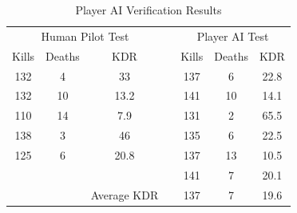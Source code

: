 \documentclass[journal]{IEEEtran}
\begin{document}
\begin{table}[]
\centering
\caption{Player AI Verification Results}
\label{tab:my-table}
\begin{tabular}{ccccccc}
\cline{1-3} \cline{5-7}
\multicolumn{3}{|c|}{Human Pilot Test}                                                       & \multicolumn{1}{c|}{} & \multicolumn{3}{c|}{Player AI Test}                                                         \\ \cline{1-3} \cline{5-7} 
\multicolumn{1}{|c|}{Kills} & \multicolumn{1}{c|}{Deaths} & \multicolumn{1}{c|}{KDR}         & \multicolumn{1}{c|}{} & \multicolumn{1}{c|}{Kills} & \multicolumn{1}{c|}{Deaths} & \multicolumn{1}{c|}{KDR}         \\ \cline{1-3} \cline{5-7} 
\multicolumn{1}{|c|}{132}   & \multicolumn{1}{c|}{4}      & \multicolumn{1}{c|}{33}          & \multicolumn{1}{c|}{} & \multicolumn{1}{c|}{137}   & \multicolumn{1}{c|}{6}      & \multicolumn{1}{c|}{22.8}        \\ \cline{1-3} \cline{5-7} 
\multicolumn{1}{|c|}{132}   & \multicolumn{1}{c|}{10}     & \multicolumn{1}{c|}{13.2}        & \multicolumn{1}{c|}{} & \multicolumn{1}{c|}{141}   & \multicolumn{1}{c|}{10}     & \multicolumn{1}{c|}{14.1}        \\ \cline{1-3} \cline{5-7} 
\multicolumn{1}{|c|}{110}   & \multicolumn{1}{c|}{14}     & \multicolumn{1}{c|}{7.9}         & \multicolumn{1}{c|}{} & \multicolumn{1}{c|}{131}   & \multicolumn{1}{c|}{2}      & \multicolumn{1}{c|}{65.5}        \\ \cline{1-3} \cline{5-7} 
\multicolumn{1}{|c|}{138}   & \multicolumn{1}{c|}{3}      & \multicolumn{1}{c|}{46}          & \multicolumn{1}{c|}{} & \multicolumn{1}{c|}{135}   & \multicolumn{1}{c|}{6}      & \multicolumn{1}{c|}{22.5}        \\ \cline{1-3} \cline{5-7} 
\multicolumn{1}{|c|}{125}   & \multicolumn{1}{c|}{6}      & \multicolumn{1}{c|}{20.8}        & \multicolumn{1}{c|}{} & \multicolumn{1}{c|}{137}   & \multicolumn{1}{c|}{13}     & \multicolumn{1}{c|}{10.5}        \\ \cline{1-3} \cline{5-7} 
                            &                             &                                  & \multicolumn{1}{c|}{} & \multicolumn{1}{c|}{141}   & \multicolumn{1}{c|}{7}      & \multicolumn{1}{c|}{20.1}        \\ \cline{3-3} \cline{5-7} 
                            & \multicolumn{1}{c|}{}       & \multicolumn{1}{c|}{Average KDR} & \multicolumn{1}{c|}{} & \multicolumn{1}{c|}{137}   & \multicolumn{1}{c|}{7}      & \multicolumn{1}{c|}{19.6}        \\ \cline{3-3} \cline{5-7} 

\end{tabular}
\end{table}
\end{document}
